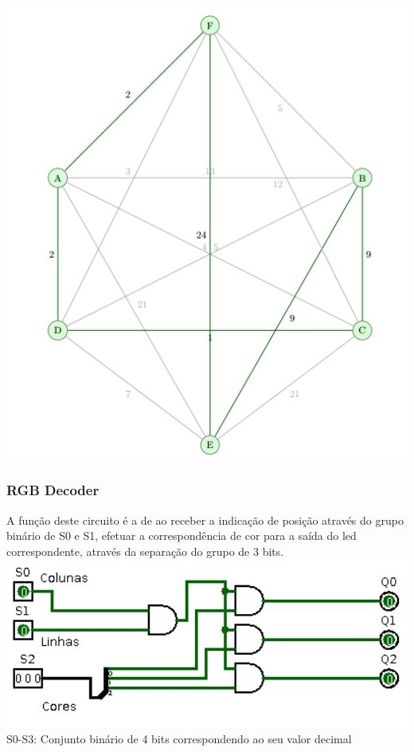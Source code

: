\documentclass[12pt,a4paper,portrait]{article}
\begin{document}
			\includegraphics[width=1.0\textwidth]{imagens/1}
			\newpage
			\subsubsection{RGB Decoder} \label{ssec:num1}
				A função deste circuito é a de ao receber a indicação de posição através do grupo binário de S0 e S1, efetuar a correspondência de cor para a saída do led correspondente, através da separação do grupo de 3 bits.\\
				\includegraphics[width=1.0\textwidth]{imagens/rgbdec}
				S0-S3: Conjunto binário de 4 bits correspondendo ao seu valor decimal\\
		\newpage						
\end{document}
